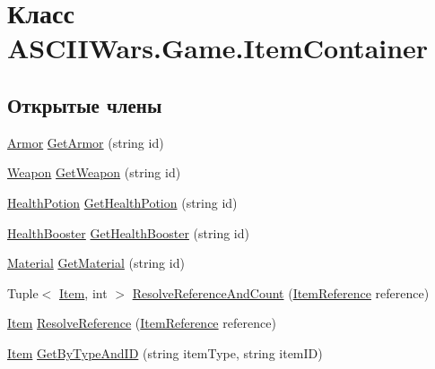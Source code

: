 \hypertarget{class_a_s_c_i_i_wars_1_1_game_1_1_item_container}{}\section{Класс A\+S\+C\+I\+I\+Wars.\+Game.\+Item\+Container}
\label{class_a_s_c_i_i_wars_1_1_game_1_1_item_container}
\subsection*{Открытые члены}
\begin{DoxyCompactItemize}
\item 
\hyperlink{class_a_s_c_i_i_wars_1_1_game_1_1_armor}{Armor} \hyperlink{class_a_s_c_i_i_wars_1_1_game_1_1_item_container_a4aa8a9dc347ac6b8b24486567110c802}{Get\+Armor} (string id)
\item 
\hyperlink{class_a_s_c_i_i_wars_1_1_game_1_1_weapon}{Weapon} \hyperlink{class_a_s_c_i_i_wars_1_1_game_1_1_item_container_aae0cb532c9242a5673e80eaff7b3edbd}{Get\+Weapon} (string id)
\item 
\hyperlink{class_a_s_c_i_i_wars_1_1_game_1_1_health_potion}{Health\+Potion} \hyperlink{class_a_s_c_i_i_wars_1_1_game_1_1_item_container_a449041c4df0b261569597be88277d92b}{Get\+Health\+Potion} (string id)
\item 
\hyperlink{class_a_s_c_i_i_wars_1_1_game_1_1_health_booster}{Health\+Booster} \hyperlink{class_a_s_c_i_i_wars_1_1_game_1_1_item_container_aa70c43020c6a423188df77bd7087feb1}{Get\+Health\+Booster} (string id)
\item 
\hyperlink{class_a_s_c_i_i_wars_1_1_game_1_1_material}{Material} \hyperlink{class_a_s_c_i_i_wars_1_1_game_1_1_item_container_a75b28ef2b5ae3acfceeb787c95eeb34b}{Get\+Material} (string id)
\item 
Tuple$<$ \hyperlink{class_a_s_c_i_i_wars_1_1_game_1_1_item}{Item}, int $>$ \hyperlink{class_a_s_c_i_i_wars_1_1_game_1_1_item_container_a0767f02c52f2192deeb1ad1276ef2351}{Resolve\+Reference\+And\+Count} (\hyperlink{class_a_s_c_i_i_wars_1_1_game_1_1_item_reference}{Item\+Reference} reference)
\item 
\hyperlink{class_a_s_c_i_i_wars_1_1_game_1_1_item}{Item} \hyperlink{class_a_s_c_i_i_wars_1_1_game_1_1_item_container_a289dd8937aa0feda17c2e8df1a2779ff}{Resolve\+Reference} (\hyperlink{class_a_s_c_i_i_wars_1_1_game_1_1_item_reference}{Item\+Reference} reference)
\item 
\hyperlink{class_a_s_c_i_i_wars_1_1_game_1_1_item}{Item} \hyperlink{class_a_s_c_i_i_wars_1_1_game_1_1_item_container_aec1dfc18aa9c761e15c5421f50691331}{Get\+By\+Type\+And\+ID} (string item\+Type, string item\+ID)
\end{DoxyCompactItemize}
